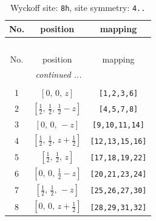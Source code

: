 \documentclass[fleqn,8pt]{jsarticle}
\begin{document}
\begin{longtable}{ccc}
\caption{Wyckoff site: {\tt 8h}, site symmetry: {\tt 4..}}
 \\
 \hline \hline
No. & position & mapping \\ \hline \endfirsthead

\multicolumn{2}{l}{\tablename\ \thetable{}} \\
 \hline \hline
No. & position & mapping \\ \hline \endhead

 \hline \hline
\multicolumn{2}{r}{\footnotesize\it continued ...} \\ \endfoot

 \hline \hline
\multicolumn{2}{r}{} \\ \endlastfoot

1 & $\left[ 0,\, 0,\, z \right]$ & {\tt [1,2,3,6]} \\ \hline
2 & $\left[ \frac{1}{2},\, \frac{1}{2},\, \frac{1}{2} - z \right]$ & {\tt [4,5,7,8]} \\ \hline
3 & $\left[ 0,\, 0,\, - z \right]$ & {\tt [9,10,11,14]} \\ \hline
4 & $\left[ \frac{1}{2},\, \frac{1}{2},\, z + \frac{1}{2} \right]$ & {\tt [12,13,15,16]} \\ \hline
5 & $\left[ \frac{1}{2},\, \frac{1}{2},\, z \right]$ & {\tt [17,18,19,22]} \\ \hline
6 & $\left[ 0,\, 0,\, \frac{1}{2} - z \right]$ & {\tt [20,21,23,24]} \\ \hline
7 & $\left[ \frac{1}{2},\, \frac{1}{2},\, - z \right]$ & {\tt [25,26,27,30]} \\ \hline
8 & $\left[ 0,\, 0,\, z + \frac{1}{2} \right]$ & {\tt [28,29,31,32]} \\
\end{longtable}
\renewcommand{\arraystretch}{1.2}
\end{document}

